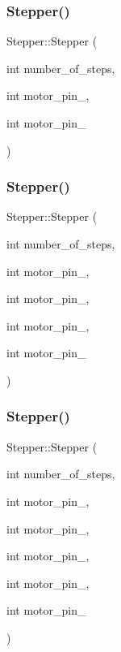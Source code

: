 \mbox{\label{class_stepper_a83820948727cdebcbd7a9c76208030fa}} 
\subsubsection{\texorpdfstring{Stepper()}{Stepper()}\hspace{0.1cm}{\footnotesize\ttfamily [2/4]}}
{\footnotesize\ttfamily Stepper\+::\+Stepper (\begin{DoxyParamCaption}\item[{int}]{number\+\_\+of\+\_\+steps,  }\item[{int}]{motor\+\_\+pin\+\_,  }\item[{int}]{motor\+\_\+pin\+\_ }\end{DoxyParamCaption})}

\mbox{\label{class_stepper_a7d1a0a0efbed9fb6134b88236b8bd361}} 
\subsubsection{\texorpdfstring{Stepper()}{Stepper()}\hspace{0.1cm}{\footnotesize\ttfamily [3/4]}}
{\footnotesize\ttfamily Stepper\+::\+Stepper (\begin{DoxyParamCaption}\item[{int}]{number\+\_\+of\+\_\+steps,  }\item[{int}]{motor\+\_\+pin\+\_,  }\item[{int}]{motor\+\_\+pin\+\_,  }\item[{int}]{motor\+\_\+pin\+\_,  }\item[{int}]{motor\+\_\+pin\+\_ }\end{DoxyParamCaption})}

\mbox{\label{class_stepper_a3e32f55782ccfac006c3cbd357302707}} 
\subsubsection{\texorpdfstring{Stepper()}{Stepper()}\hspace{0.1cm}{\footnotesize\ttfamily [4/4]}}
{\footnotesize\ttfamily Stepper\+::\+Stepper (\begin{DoxyParamCaption}\item[{int}]{number\+\_\+of\+\_\+steps,  }\item[{int}]{motor\+\_\+pin\+\_,  }\item[{int}]{motor\+\_\+pin\+\_,  }\item[{int}]{motor\+\_\+pin\+\_,  }\item[{int}]{motor\+\_\+pin\+\_,  }\item[{int}]{motor\+\_\+pin\+\_ }\end{DoxyParamCaption})}



